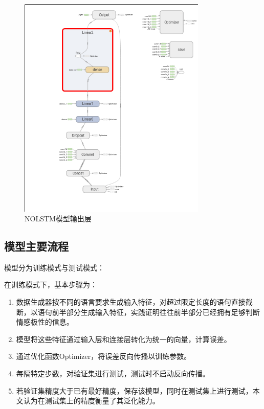 \begin{figure}[!hbp]
\begin{center}
\includegraphics[width=0.8\textwidth]{graphic/nolstm4.png}
\caption{NOLSTM模型输出层 \label{nolstm3}}
\end{center}
\end{figure}
\subsection{模型主要流程}


模型分为训练模式与测试模式：\par
在训练模式下，基本步骤为：\par
\begin{enumerate}
\item 数据生成器按不同的语言要求生成输入特征，对超过限定长度的语句直接截断，以语句前半部分生成输入特征，实践证明往往前半部分已经拥有足够判断情感极性的信息。
\item 模型将这些特征通过输入层和连接层转化为统一的向量，计算误差。
\item 通过优化函数Optimizer，将误差反向传播以训练参数。
\item 每隔特定步数，对验证集进行测试，测试时不启动反向传播。
\item 若验证集精度大于已有最好精度，保存该模型，同时在测试集上进行测试，本文认为在测试集上的精度衡量了其泛化能力。
\end{enumerate}


